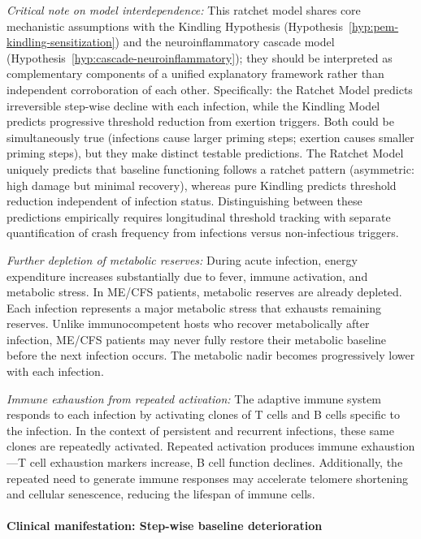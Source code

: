 \begin{speculation}
\textit{Critical note on model interdependence:} This ratchet model shares core mechanistic assumptions with the Kindling Hypothesis (Hypothesis~\ref{hyp:pem-kindling-sensitization}) and the neuroinflammatory cascade model (Hypothesis~\ref{hyp:cascade-neuroinflammatory}); they should be interpreted as complementary components of a unified explanatory framework rather than independent corroboration of each other. Specifically: the Ratchet Model predicts irreversible step-wise decline with each infection, while the Kindling Model predicts progressive threshold reduction from exertion triggers. Both could be simultaneously true (infections cause larger priming steps; exertion causes smaller priming steps), but they make distinct testable predictions. The Ratchet Model uniquely predicts that baseline functioning follows a ratchet pattern (asymmetric: high damage but minimal recovery), whereas pure Kindling predicts threshold reduction independent of infection status. Distinguishing between these predictions empirically requires longitudinal threshold tracking with separate quantification of crash frequency from infections versus non-infectious triggers.

\textit{Further depletion of metabolic reserves:} During acute infection, energy expenditure increases substantially due to fever, immune activation, and metabolic stress. In ME/CFS patients, metabolic reserves are already depleted. Each infection represents a major metabolic stress that exhausts remaining reserves. Unlike immunocompetent hosts who recover metabolically after infection, ME/CFS patients may never fully restore their metabolic baseline before the next infection occurs. The metabolic nadir becomes progressively lower with each infection.

\textit{Immune exhaustion from repeated activation:} The adaptive immune system responds to each infection by activating clones of T cells and B cells specific to the infection. In the context of persistent and recurrent infections, these same clones are repeatedly activated. Repeated activation produces immune exhaustion---T cell exhaustion markers increase, B cell function declines. Additionally, the repeated need to generate immune responses may accelerate telomere shortening and cellular senescence, reducing the lifespan of immune cells.

\paragraph{Clinical manifestation: Step-wise baseline deterioration}


\end{speculation}
